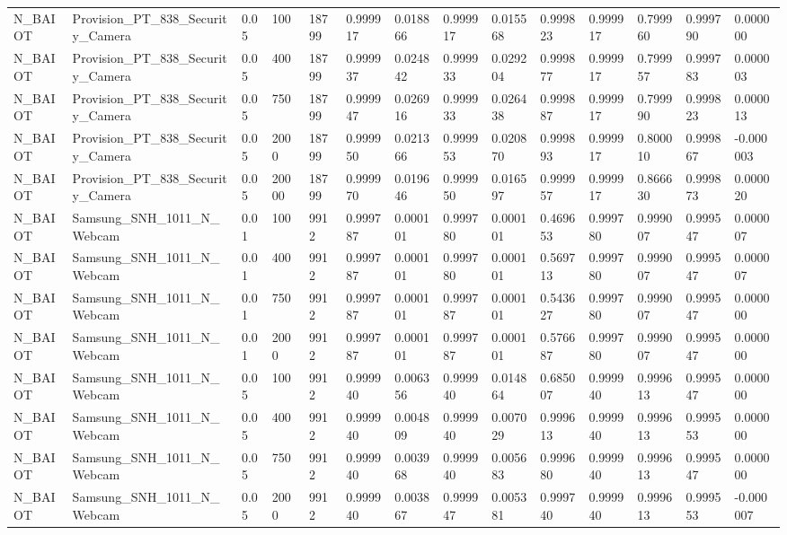 \begin{tabular}{llllllllllllll}
N\_BAIOT & Provision\_PT\_838\_Security\_Camera & 0.05 & 100 & 18799 & 0.999917 & 0.018866 & 0.999917 & 0.015568 & 0.999823 & 0.999917 & 0.799960 & 0.999790 & 0.000000 \\
N\_BAIOT & Provision\_PT\_838\_Security\_Camera & 0.05 & 400 & 18799 & 0.999937 & 0.024842 & 0.999933 & 0.029204 & 0.999877 & 0.999917 & 0.799957 & 0.999783 & 0.000003 \\
N\_BAIOT & Provision\_PT\_838\_Security\_Camera & 0.05 & 750 & 18799 & 0.999947 & 0.026916 & 0.999933 & 0.026438 & 0.999887 & 0.999917 & 0.799990 & 0.999823 & 0.000013 \\
N\_BAIOT & Provision\_PT\_838\_Security\_Camera & 0.05 & 2000 & 18799 & 0.999950 & 0.021366 & 0.999953 & 0.020870 & 0.999893 & 0.999917 & 0.800010 & 0.999867 & -0.000003 \\
N\_BAIOT & Provision\_PT\_838\_Security\_Camera & 0.05 & 20000 & 18799 & 0.999970 & 0.019646 & 0.999950 & 0.016597 & 0.999957 & 0.999917 & 0.866630 & 0.999873 & 0.000020 \\
N\_BAIOT & Samsung\_SNH\_1011\_N\_Webcam & 0.01 & 100 & 9912 & 0.999787 & 0.000101 & 0.999780 & 0.000101 & 0.469653 & 0.999780 & 0.999007 & 0.999547 & 0.000007 \\
N\_BAIOT & Samsung\_SNH\_1011\_N\_Webcam & 0.01 & 400 & 9912 & 0.999787 & 0.000101 & 0.999780 & 0.000101 & 0.569713 & 0.999780 & 0.999007 & 0.999547 & 0.000007 \\
N\_BAIOT & Samsung\_SNH\_1011\_N\_Webcam & 0.01 & 750 & 9912 & 0.999787 & 0.000101 & 0.999787 & 0.000101 & 0.543627 & 0.999780 & 0.999007 & 0.999547 & 0.000000 \\
N\_BAIOT & Samsung\_SNH\_1011\_N\_Webcam & 0.01 & 2000 & 9912 & 0.999787 & 0.000101 & 0.999787 & 0.000101 & 0.576687 & 0.999780 & 0.999007 & 0.999547 & 0.000000 \\
N\_BAIOT & Samsung\_SNH\_1011\_N\_Webcam & 0.05 & 100 & 9912 & 0.999940 & 0.006356 & 0.999940 & 0.014864 & 0.685007 & 0.999940 & 0.999613 & 0.999547 & 0.000000 \\
N\_BAIOT & Samsung\_SNH\_1011\_N\_Webcam & 0.05 & 400 & 9912 & 0.999940 & 0.004809 & 0.999940 & 0.007029 & 0.999613 & 0.999940 & 0.999613 & 0.999553 & 0.000000 \\
N\_BAIOT & Samsung\_SNH\_1011\_N\_Webcam & 0.05 & 750 & 9912 & 0.999940 & 0.003968 & 0.999940 & 0.005683 & 0.999680 & 0.999940 & 0.999613 & 0.999547 & 0.000000 \\
N\_BAIOT & Samsung\_SNH\_1011\_N\_Webcam & 0.05 & 2000 & 9912 & 0.999940 & 0.003867 & 0.999947 & 0.005381 & 0.999740 & 0.999940 & 0.999613 & 0.999553 & -0.000007 \\

\end{tabular}
